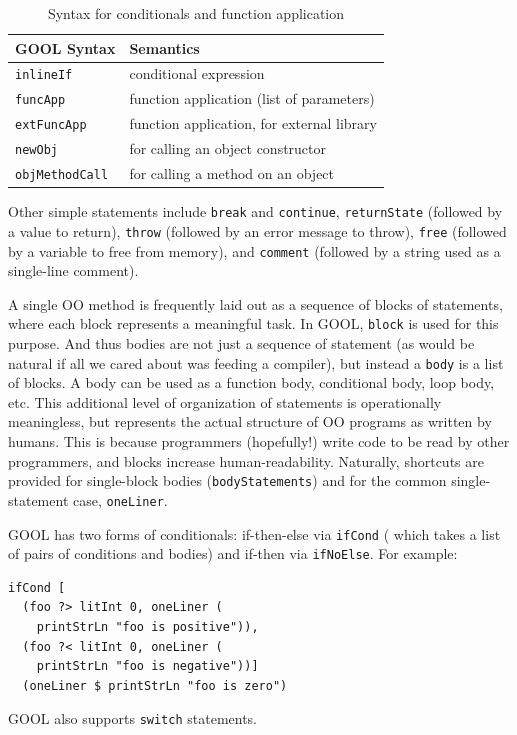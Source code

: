 \documentclass[sigplan,review,anonymous,prologue,dvipsnames]{acmart}
\begin{document}
\begin{table}[htb]
  \caption{Syntax for conditionals and function application}
  \begin{tabular}{p{} p{}}
    \textbf{GOOL Syntax} & \textbf{Semantics} \\
    \midrule
    \verb|inlineIf| & conditional expression \\
    \verb|funcApp| & function application (list of parameters) \\
    \verb|extFuncApp| & function application, for external library
    \\
    \verb|newObj| & for calling an object constructor \\
    \verb|objMethodCall| & for calling a method on an object \\
  \end{tabular}
  \label{tab:values}
\end{table}

Other simple statements include \verb|break| and \verb|continue|,
\verb|returnState| (followed by a value to return), \verb|throw| (followed by an
error message to throw), \verb|free| (followed by a variable to free from
memory), and \verb|comment| (followed by a string used as a
single-line comment).

A single OO method is frequently laid out as a sequence of blocks of
statements, where each block represents a meaningful task.  In GOOL,
\verb|block| is used for this purpose. And thus bodies are not just a
sequence of statement (as would be natural if all we cared about was
feeding a compiler), but instead a \verb|body| is a list of blocks.
A body can be used as a function body, conditional body, loop
body, etc. This additional level of organization of statements is
operationally meaningless, but represents the actual structure of OO programs
as written by humans.  This is because programmers (hopefully!) write code to
be read by other programmers, and blocks increase human-readability.
Naturally, shortcuts are provided for single-block bodies
(\verb|bodyStatements|) and for the common single-statement case,
\verb|oneLiner|.

GOOL has two forms of conditionals: if-then-else via \verb|ifCond| (
which takes a list of pairs of conditions and bodies) and
if-then via \verb|ifNoElse|.  For example:
\begin{lstlisting}
ifCond [
  (foo ?> litInt 0, oneLiner (
    printStrLn "foo is positive")),
  (foo ?< litInt 0, oneLiner (
    printStrLn "foo is negative"))]
  (oneLiner $ printStrLn "foo is zero")
\end{lstlisting}
GOOL also supports \verb|switch| statements.
\end{document}

